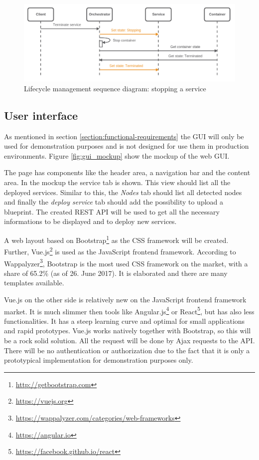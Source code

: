 \begin{figure}[H]
    \centering
    \includegraphics[width=\textwidth]{resources/images/lifecycle_sequence_diagram_stop_service.png}
    \caption[Lifecycle management sequence diagram: stopping a service]{Lifecycle management sequence diagram: stopping a service}
    \label{fig:lifecycle_mgm_squence_diagram_stop_service}
\end{figure}


\subsection{User interface}
As mentioned in section \ref{section:functional-requirements} the \ac{GUI} will only be used for demonstration purposes and is not designed for use them in production environments.
Figure \ref{fig:gui_mockup} show the mockup of the web \ac{GUI}.

The page has components like the header area, a navigation bar and the content area.
In the mockup the service tab is shown.
This view should list all the deployed services.
Similar to this, the \textit{Nodes} tab should list all detected nodes and finally the \textit{deploy service} tab should add the possibility to upload a blueprint.
The created \ac{REST} \ac{API} will be used to get all the necessary informations to be displayed and to deploy new services.

A web layout based on Bootstrap\footnote{\url{http://getbootstrap.com}} as the \ac{CSS} framework will be created.
Further, Vue.js\footnote{\url{https://vuejs.org}} is used as the JavaScript frontend framework.
According to Wappalyzer\footnote{\url{https://wappalyzer.com/categories/web-frameworks}}, Bootstrap is the most used \ac{CSS} framework on the market, with a share of 65.2\% (as of 26. June 2017).
It is elaborated and there are many templates available.

Vue.js on the other side is relatively new on the JavaScript frontend framework market.
It is much slimmer then tools like Angular.js\footnote{\url{https://angular.io}} or React\footnote{\url{https://facebook.github.io/react}}, but has also less functionalities.
It has a steep learning curve and optimal for small applications and rapid prototypes.
Vue.js works natively together with Bootstrap, so this will be a rock solid solution.
All the request will be done by Ajax requests to the \ac{API}.
There will be no authentication or authorization due to the fact that it is only a prototypical implementation for demonstration purposes only.

